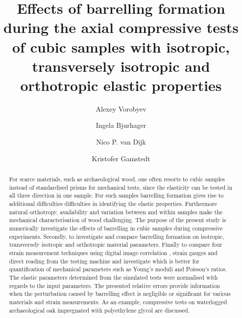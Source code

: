 \documentclass[3p]{elsarticle}
\begin{document}
\doublespacing


\begin{frontmatter}

\title{Effects of barrelling formation during the axial compressive tests of cubic
samples with  isotropic, transversely isotropic and orthotropic elastic
properties} 








\author{Alexey Vorobyev}


\author{Ingela Bjurhager}
\author{Nico P. van Dijk}
\author{Kristofer Gamstedt}

\address{Division of Appplied Mechanics, Uppsala University, Box 534,
SE-751 21, Uppsala, Sweden}



\begin{abstract}
For scarce materials, such as archaeological wood, one often resorts to cubic
samples instead of standardised prisms for mechanical tests, since the elasticity can be tested in all three direction in one sample. For such samples
barrelling  formation gives rise to additional difficulties difficulties in
identifying the elastic properties.
Furthermore natural orthotropy, availability and variation between and within
samples make the mechanical characterisation of wood  challenging. 
The purpose of the present study is numerically investigate the effects of barrelling
in cubic samples during compressive experiments. Secondly, to investigate and
compare barrelling formation on isotropic, transversely 
isotropic and orthotropic material parameters. 
Finally to compare four strain measurement techniques using
digital image correlation , strain gauges and direct
reading from the testing machine and investigate which is better for
quantification of mechanical parameters such as Young's moduli and Poisson's ratios.
The elastic parameters determined from the simulated tests were normalised with regards to the input parameters. The presented relative errors provide information when the perturbation caused by barrelling effect is negligible or significant for various materials and strain measurements. 
As an example, compressive tests on waterlogged archaeological oak impregnated
with polyethylene glycol are discussed.




\end{abstract}
\end{frontmatter}
\end{document}
